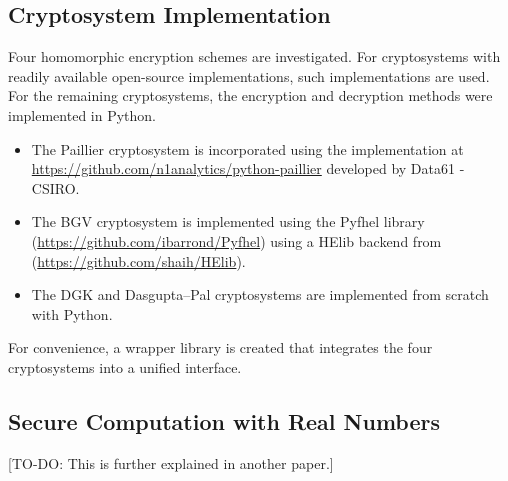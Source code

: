 \subsection{Cryptosystem Implementation}
Four homomorphic encryption schemes are investigated. For cryptosystems with readily available open-source implementations, such implementations are used. For the remaining cryptosystems, the encryption and decryption methods were implemented in Python.
\begin{itemize}
	\item The Paillier cryptosystem is incorporated using the implementation at \url{https://github.com/n1analytics/python-paillier} developed by Data61 - CSIRO.
	\item The BGV cryptosystem is implemented using the Pyfhel library (\url{https://github.com/ibarrond/Pyfhel}) using a HElib backend from (\url{https://github.com/shaih/HElib}).
	\item The DGK and Dasgupta--Pal cryptosystems are implemented from scratch with Python.
\end{itemize}

For convenience, a wrapper library is created that integrates the four cryptosystems into a unified interface.

\subsection{Secure Computation with Real Numbers}
[TO-DO: This is further explained in another paper.]

